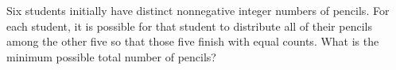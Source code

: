 Six students initially have distinct nonnegative integer numbers of pencils. For each student, it is possible for that student to distribute all of their pencils among the other five so that those five finish with equal counts. What is the minimum possible total number of pencils?
